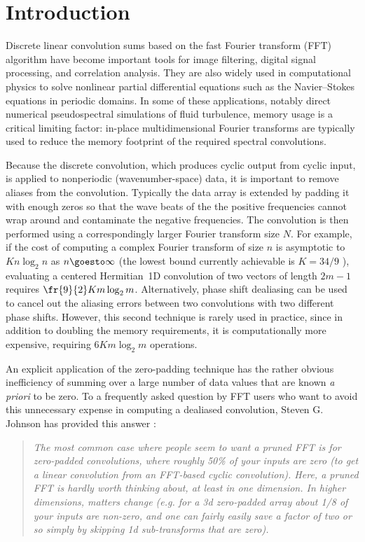 \documentclass[final]{siamltex}
\begin{document}



\section{Introduction}
Discrete linear convolution sums based on the fast Fourier transform (FFT)
algorithm \cite{Gauss1866,Cooley65} have become important tools for image
filtering, digital signal
processing, and correlation analysis. They are also widely used in
computational physics to solve nonlinear partial differential equations
such as the Navier--Stokes equations in periodic domains. In some of these
applications, notably direct numerical pseudospectral simulations of fluid
turbulence, memory usage is a critical limiting factor: in-place
multidimensional Fourier transforms are typically used to reduce the memory
footprint of the required spectral convolutions.

Because the discrete convolution, which produces cyclic output from cyclic
input, is applied to nonperiodic (wavenumber-space) data, it is important
to remove aliases from the convolution. Typically the data array is
extended by padding it with enough zeros so that the wave beats of the
the positive frequencies cannot wrap around and contaminate
the negative frequencies. The convolution is then performed using a
correspondingly larger Fourier transform size $N$. For example, if the cost of 
computing a complex Fourier transform of size $n$ is asymptotic to 
$K n\log_2 n$ as $n\goesto\infty$ (the lowest bound currently 
achievable is $K=34/9$ \cite{Johnson07,Lundy07}), evaluating a centered 
Hermitian~1D convolution of two vectors of length $2m-1$ requires
$\fr{9}{2}Km\log_2 m$.
Alternatively, phase shift dealiasing \cite{Patterson71,Canuto} can be used
to cancel out the aliasing errors between two convolutions with two
different phase shifts. However, this second technique is rarely used in
practice, since in addition to doubling the memory requirements, it is
computationally more expensive, requiring $6K m\log_2 m$ operations.

An explicit application of the zero-padding technique has the rather
obvious inefficiency of summing over a large number of data values that
are known {\it a priori\/} to be zero.
To a frequently asked question by FFT users who want to avoid this
unnecessary expense in computing a dealiased convolution,
Steven G. Johnson has provided this
answer \cite{http://www.fftw.org/pruned.html}:
\begin{quotation}
{\it
The most common case where people seem to want a pruned FFT is for
zero-padded convolutions, where roughly 50\% of your inputs are zero (to
get a linear convolution from an FFT-based cyclic convolution). Here, a
pruned FFT is hardly worth thinking about, at least in one dimension. In
higher dimensions, matters change (e.g. for a 3d zero-padded array about
1/8 of your inputs are non-zero, and one can fairly easily save a factor of
two or so simply by skipping 1d sub-transforms that are zero).
}
\end{quotation}
\end{document}
